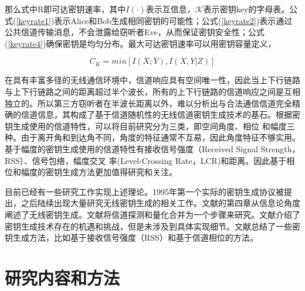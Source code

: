 \documentclass[master]{seuthesis} %
\begin{document}
\begin{Main}
那么式中R即可达密钥速率，其中$I(\cdot)$表示互信息，$\mathcal{K}$表示密钥key的字母表。公式(\ref{keyrate1})表示Alice和Bob生成相同密钥的可能性；公式(\ref{keyrate2})表示通过公共信道传输消息，不会泄露给窃听者Eve，从而保证密钥安全性；公式(\ref{keyrate4})确保密钥是均匀分布。最大可达密钥速率可以用密钥容量定义，

\begin{equation}
    C_K = min[I(X;Y), I(X, Y|Z)]
\end{equation}

在具有丰富多径的无线通信环境中，信道响应具有空间唯一性，因此当上下行链路与上下行链路之间的距离超过半个波长，所有的上下行链路的信道响应之间是互相独立的\cite{jakes1994microwave}。所以第三方窃听者在半波长距离以外，难以分析出与合法通信信道完全精确的信道信息，其构成了基于信道随机性的无线信道密钥生成技术的基石\cite{aono2005wireless, badawy2015secret, koorapaty2000secure, sayeed2008secure, chorti2012helping, shehadeh2012towards, jana2009effectiveness, mathur2008radio, patwari2009high, croft2010robust, liu2014group, azimi2007robust, tope2001unconditionally, liu2014secret, badawy2016robust, zhang2016efficient, xi2014keep, liu2012exploiting, ye2010information, gungor2011secret}。根据密钥生成使用的信道特性，可以将目前研究分为三类，即空间角度\cite{aono2005wireless}\cite{badawy2015secret}、相位
\cite{koorapaty2000secure, sayeed2008secure, chorti2012helping, shehadeh2012towards}和幅度三种。由于离开角和到达角不同，角度的特征通常不互易，因此角度特征不够实用。基于幅度的密钥生成使用的信道特性有接收信号强度（Received Signal Strength，RSS）\cite{jana2009effectiveness, mathur2008radio, patwari2009high, croft2010robust, liu2014group}、信号包络\cite{azimi2007robust, tope2001unconditionally, liu2014secret, badawy2016robust, zhang2016efficient, xi2014keep, liu2012exploiting}，幅度交叉
率(Level-Crossing Rate，LCR)\cite{ye2010information}和距离\cite{gungor2011secret}。因此基于相位和幅度的密钥生成方法更加值得研究和关注。

目前已经有一些研究工作实现上述理论。1995年第一个实际的密钥生成协议被提出\cite{hershey1995unconventional}，之后陆续出现大量研究无线密钥生成的相关工作。文献\citet{WangSurvey}的第四章从信息论角度阐述了无线密钥生成。文献\citet{WangSurvey}将信道探测和量化合并为一个步骤来研究。文献\citet{zeng2015physical}介绍了密钥生成技术存在的机遇和挑战，但是未涉及到具体实现细节。文献\citet{ren2011secret}总结了一些密钥生成方法，比如基于接收信号强度（RSS）\cite{luo2016rss}和基于信道相位的方法\cite{wang2011fast}。

\section{研究内容和方法}


\end{Main}
\end{document}
